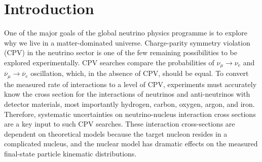 \section{Introduction}
One of the major goals of the global neutrino physics programme is to explore why we live in a matter-dominated universe. Charge-parity symmetry violation (CPV) in the neutrino sector is one of the few remaining possibilities to be explored experimentally. 
CPV searches compare the probabilities of $\nu_{\mu}\!\rightarrow\!\nu_e$ and $\overline{\nu}_{\mu}\!\rightarrow\!\overline{\nu}_e$ oscillation, which, in the absence of CPV, should be equal. 
To convert the measured rate of interactions to a level of CPV, experiments must accurately know the cross section for the interactions of neutrinos and anti-neutrinos with detector materials, most importantly hydrogen, carbon, oxygen, argon, and iron. 
Therefore, systematic uncertainties on neutrino-nucleus interaction cross sections are a key input to such CPV searches.  
These interaction cross-sections are dependent on theoretical models because the target nucleon resides in a complicated nucleus, and the nuclear model has dramatic effects on the measured final-state particle kinematic distributions\cite{Mosel:2016cwa}.

